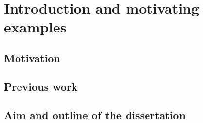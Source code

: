 \chapter{Introduction and motivating examples}

\section{Motivation}

\section{Previous work}

\section{Aim and outline of the dissertation}